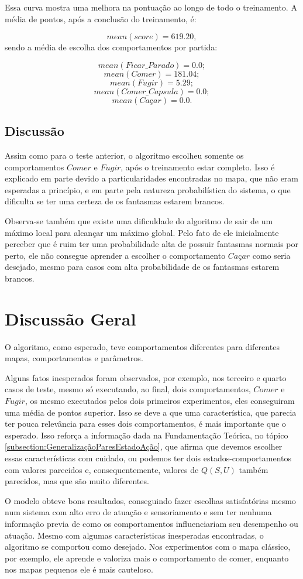 Essa curva mostra uma melhora na pontuação ao longo de todo o treinamento. A média de pontos, após a conclusão do treinamento, é:

$$ mean \left( score \right) = 619.20, $$
sendo a média de escolha dos comportamentos por partida:

$$ mean \left( Ficar\_Parado \right) = 0.0; $$
$$ mean \left( Comer \right) = 181.04; $$
$$ mean \left( Fugir \right) = 5.29; $$
$$ mean \left( Comer\_Capsula \right) = 0.0; $$
$$ mean \left( \textit{Caçar} \right) = 0.0. $$


\subsection{Discussão}

Assim como para o teste anterior, o algoritmo escolheu somente os comportamentos $ Comer $ e $ Fugir $, após o treinamento estar completo. Isso é explicado em parte devido a particularidades encontradas no mapa, que não eram esperadas a princípio, e em parte pela natureza probabilística do sistema, o que dificulta se ter uma certeza de os fantasmas estarem brancos.

Observa-se também que existe uma dificuldade do algoritmo de sair de um máximo local para alcançar um máximo global. Pelo fato de ele inicialmente perceber que é ruim ter uma probabilidade alta de possuir fantasmas normais por perto, ele não consegue aprender a escolher o comportamento $ \textit{Caçar} $ como seria desejado, mesmo para casos com alta probabilidade de os fantasmas estarem brancos.

\section{Discussão Geral}

O algoritmo, como esperado, teve comportamentos diferentes para diferentes mapas, comportamentos e parâmetros.

Alguns fatos inesperados foram observados, por exemplo, nos terceiro e quarto casos de teste, mesmo só executando, ao final, dois comportamentos, $ Comer $ e $ Fugir $, os mesmo executados pelos dois primeiros experimentos, eles conseguiram uma média de pontos superior. Isso se deve a que uma característica, que parecia ter pouca relevância para esses dois comportamentos, é mais importante que o esperado. Isso reforça a informação dada na Fundamentação Teórica, no tópico \ref{subsection:GeneralizaçãoParesEstadoAção}, que afirma que devemos escolher essas características com cuidado, ou podemos ter dois estados-comportamentos com valores parecidos e, consequentemente, valores de $ Q \left( S, U \right) $ também parecidos, mas que são muito diferentes.

O modelo obteve bons resultados, conseguindo fazer escolhas satisfatórias mesmo num sistema com alto erro de atuação e sensoriamento e sem ter nenhuma informação previa de como os comportamentos influenciariam seu desempenho ou atuação. Mesmo com algumas características inesperadas encontradas, o algoritmo se comportou como desejado. Nos experimentos com o mapa clássico, por exemplo, ele aprende e valoriza mais o comportamento de comer, enquanto nos mapas pequenos ele é mais cauteloso.
